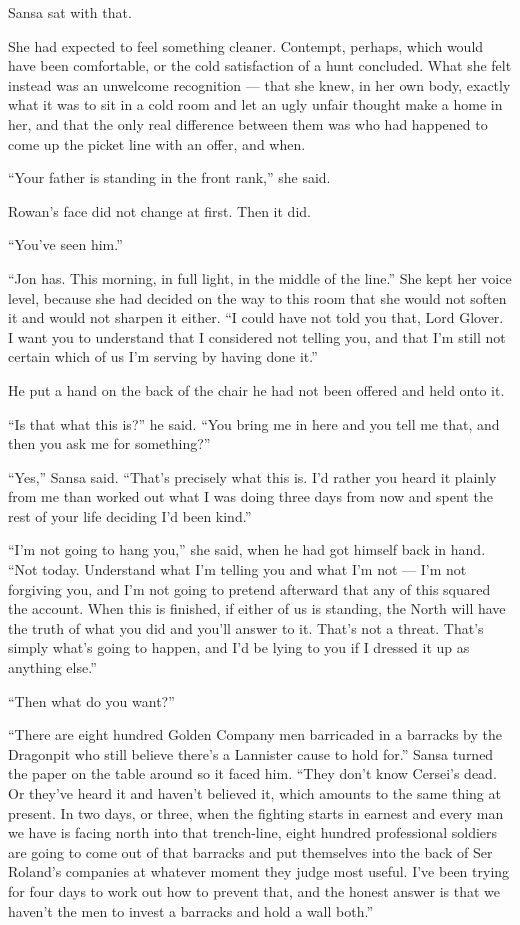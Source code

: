 Sansa sat with that.

She had expected to feel something cleaner. Contempt, perhaps, which would have been comfortable, or the cold satisfaction of a hunt concluded. What she felt instead was an unwelcome recognition — that she knew, in her own body, exactly what it was to sit in a cold room and let an ugly unfair thought make a home in her, and that the only real difference between them was who had happened to come up the picket line with an offer, and when.

“Your father is standing in the front rank,” she said.

Rowan’s face did not change at first. Then it did.

“You’ve seen him.”

“Jon has. This morning, in full light, in the middle of the line.” She kept her voice level, because she had decided on the way to this room that she would not soften it and would not sharpen it either. “I could have not told you that, Lord Glover. I want you to understand that I considered not telling you, and that I’m still not certain which of us I’m serving by having done it.”

He put a hand on the back of the chair he had not been offered and held onto it.

“Is that what this is?” he said. “You bring me in here and you tell me that, and then you ask me for something?”

“Yes,” Sansa said. “That’s precisely what this is. I’d rather you heard it plainly from me than worked out what I was doing three days from now and spent the rest of your life deciding I’d been kind.”

\sceneBreak

“I’m not going to hang you,” she said, when he had got himself back in hand. “Not today. Understand what I’m telling you and what I’m not — I’m not forgiving you, and I’m not going to pretend afterward that any of this squared the account. When this is finished, if either of us is standing, the North will have the truth of what you did and you’ll answer to it. That’s not a threat. That’s simply what’s going to happen, and I’d be lying to you if I dressed it up as anything else.”

“Then what do you want?”

“There are eight hundred Golden Company men barricaded in a barracks by the Dragonpit who still believe there’s a Lannister cause to hold for.” Sansa turned the paper on the table around so it faced him. “They don’t know Cersei’s dead. Or they’ve heard it and haven’t believed it, which amounts to the same thing at present. In two days, or three, when the fighting starts in earnest and every man we have is facing north into that trench-line, eight hundred professional soldiers are going to come out of that barracks and put themselves into the back of Ser Roland’s companies at whatever moment they judge most useful. I’ve been trying for four days to work out how to prevent that, and the honest answer is that we haven’t the men to invest a barracks and hold a wall both.”

